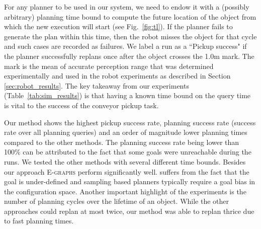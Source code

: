 \documentclass[a4paper,10pt]{article}
\begin{document}
For any planner to be used in our system, we need to endow it with a (possibly arbitrary) planning time bound to compute the future location of the object from which the new execution will start (see Fig.~\ref{fig:tl}). 
%
If the planner fails to generate the plan within this time, then the robot misses the object for that cycle and such cases are recorded as failures. 
%
We label a run as a ``Pickup success" if the planner successfully replans once after the object crosses the 1.0m mark. The mark is the mean of accurate perception range that was determined experimentally and used in the robot experiments as described in Section \ref{sec:robot_results}.
%
The key takeaway from our experiments (Table~\ref{tab:sim_results}) is that having a known time bound on the query time is vital to the success of the conveyor pickup task.

Our method shows the highest pickup success rate, planning success rate (success rate over all planning queries) and an order of magnitude lower planning times compared to the other methods. 
The planning success rate being lower than 100\% can be attributed to the fact that some goals were unreachable during the runs. 
%
We tested the other methods with several different time bounds. Besides our approach \textsc{E-graphs} perform significantly well. \rrt suffers from the fact that the goal is under-defined and sampling based planners typically require a goal bias in the configuration space. Another important highlight of the experiments is the number of planning cycles over the lifetime of an object. While the other approaches could replan at most twice, our method was able to replan thrice due to fast planning times.
\end{document}
